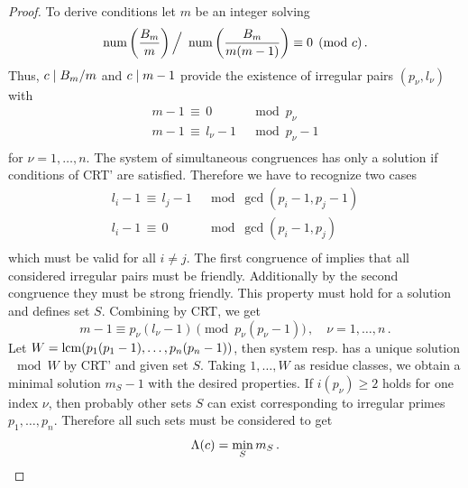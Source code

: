 \documentclass[12pt,english]{article}
\begin{document}
\begin{proof}
To derive conditions let $m$ be an integer solving
\[
      \mathop{\rm num}\nolimits \left( \frac{B_m}{m} \right) \Big/ \
         \mathop{\rm num}\nolimits \left( \frac{B_m}{m(m-1)} \right) \equiv 0 \pmod{c} \,.
\]
Thus, $c \mid B_m/m$ and $c \mid m-1$ provide
the existence of irregular pairs $(p_\nu,l_\nu)$ with
\begin{equation} \label{eqn-loc-LamdaC-1}
  \begin{array}{ll}
    m - 1 \,\equiv\, 0       & \mod{p_\nu} \\
    m - 1 \,\equiv\, l_\nu-1 & \mod{p_\nu-1} \\
  \end{array}
\end{equation}
for $\nu=1,\ldots,n$.
The system  of simultaneous congruences
has only a solution if conditions of CRT' are satisfied.
Therefore we have to recognize two cases
\begin{equation} \label{eqn-loc-LamdaC-2}
  \begin{array}{ll}
    l_i-1 \,\equiv\, l_j-1 & \mod{\gcd(p_i-1,p_j-1)} \\
    l_i-1 \,\equiv\, 0     & \mod{\gcd(p_i-1,p_j)} \\
  \end{array}
\end{equation}
which must be valid for all $i \neq j$.
The first congruence of  implies
that all considered irregular pairs must be friendly.
Additionally by the second congruence they must be strong friendly.
This property must hold for a solution and defines set $S$.
Combining  by CRT, we get
\begin{equation} \label{eqn-loc-LamdaC-3}
    m-1 \equiv p_\nu(l_\nu-1) \pmod{p_\nu(p_\nu-1)} \,, \quad
      \nu=1,\ldots,n \,.
\end{equation}
Let $W=\mathop{\rm lcm}\nolimits(p_1(p_1-1),\ldots,p_n(p_n-1))$,
then system  resp.
 has a unique solution $\mod{W}$ by CRT'
and given set $S$.
Taking $1,\ldots,W$ as residue classes, we obtain a
minimal solution $m_S-1$ with the desired properties.
If $i(p_\nu) \geq 2$ holds for one index $\nu$, then probably other
sets $S$ can exist corresponding to irregular primes $p_1,\ldots,p_n$.
Therefore all such sets must be considered to get
\[
    \Lambda(c) = \min_S m_S \,. \vspace*{-4ex}
\]
\end{proof}
\medskip
\end{document}
